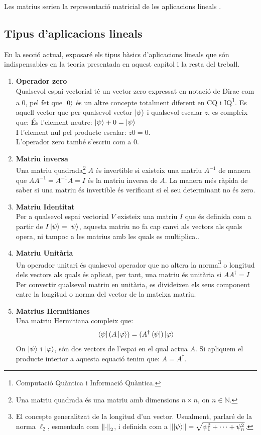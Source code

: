 Les matrius serien la representació matricial de les aplicacions lineals \cite{LR_done_right:matrix}.

\subsection{Tipus d'aplicacions lineals}
En la secció actual, exposaré els tipus bàsics d'aplicacions lineals que són indispensables en la teoria presentada en aquest capítol i la resta del treball.

\begin{enumerate}
	\item \textbf{Operador zero} \\
	Qualsevol espai vectorial té un vector zero expressat en notació de Dirac com a $0$, pel fet que $\ket{0}$ és un altre concepte totalment diferent en CQ i IQ\footnote{Computació Quàntica i Informació Quàntica.}. Es aquell vector que per qualsevol vector $\ket{\psi}$ i qualsevol escalar $z$, es compleix que:
	És l'element neutre: $\ket{\psi} + 0 = \ket{\psi} $\\
	I l'element nul pel producte escalar: $z0 = 0$. \\
	L'operador zero també s'escriu com a $0$.
	
	\item \textbf{Matriu inversa} \\
	Una matriu quadrada\footnote{Una matriu quadrada és una matriu amb dimensions $n\times n$, on $n \in \mathbb{N}$.} $A$ és invertible si existeix una matriu $A^{-1}$ de manera que $AA^{-1}=A^{-1}A = I$ és la matriu inversa de $A$. La manera més ràpida de saber si una matriu és invertible és verificant si el seu determinant no és zero.

	\item \textbf{Matriu Identitat} \\
	Per a qualsevol espai vectorial $V$ existeix una matriu $I$ que és definida com a partir de $I\ket{\psi} = \ket{\psi}$, aquesta matriu no fa cap canvi als vectors als quals opera, ni tampoc a les matrius amb les quals es multiplica..
	
	\item \textbf{Matriu Unitària} \\
	Un operador unitari és qualsevol operador que no altera la norma\footnote{El concepte generalitzat de la longitud d'un vector. Usualment, parlaré de la norma $\ell_2$, esmentada com $\norm{\cdot}_2$, i definida com a $\norm{\ket{\psi}} = \sqrt{\psi^2_1 + \cdots + \psi^2_n}$.} o longitud dels vectors als quals és aplicat, per tant, una matriu és unitària si $AA^\dagger = I$
	Per convertir qualsevol matriu en unitària, es divideixen els seus component entre la longitud o norma del vector de la mateixa matriu.
	
	\item \textbf{Matrius Hermitianes} \\
	Una matriu Hermitiana compleix que: 
	$$
	\bra{\psi} (A \ket{\varphi}) = (A^\dagger\bra{\psi})\ket{\varphi}
	$$
	On $\ket{\psi}$ i $\ket{\varphi}$, són dos vectors de l'espai en el qual actua $A$. Si apliquem el producte interior a aquesta equació tenim que: $A = A^\dagger$.
	
\end{enumerate}

